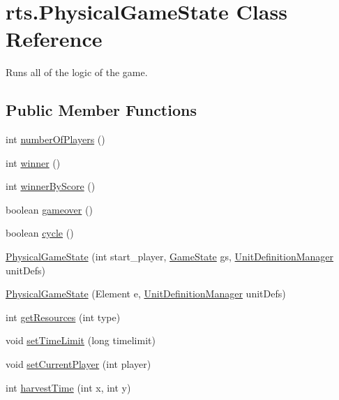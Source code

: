 \hypertarget{classrts_1_1_physical_game_state}{
\section{rts.PhysicalGameState Class Reference}
\label{classrts_1_1_physical_game_state}
}


Runs all of the logic of the game.  


\subsection*{Public Member Functions}
\begin{DoxyCompactItemize}
\item 
int \hyperlink{classrts_1_1_physical_game_state_a463cfb14c53ed9b8cdf0bd9a30245ec9}{numberOfPlayers} ()
\item 
int \hyperlink{classrts_1_1_physical_game_state_a4f47cea7ed91e75de4b9f9f160432f73}{winner} ()
\item 
int \hyperlink{classrts_1_1_physical_game_state_a204bd83cc193bcd2f0fa64b83547acd5}{winnerByScore} ()
\item 
boolean \hyperlink{classrts_1_1_physical_game_state_a1c524d46ccbf32aeddb8ba5cbe9f47c6}{gameover} ()
\item 
boolean \hyperlink{classrts_1_1_physical_game_state_a74a986ee337aa743097249693fdfd449}{cycle} ()
\item 
\hyperlink{classrts_1_1_physical_game_state_adff3634b5f1680a8df120f48ce96f78c}{PhysicalGameState} (int start\_\-player, \hyperlink{classrts_1_1_game_state}{GameState} gs, \hyperlink{classrts_1_1units_1_1_unit_definition_manager}{UnitDefinitionManager} unitDefs)
\item 
\hyperlink{classrts_1_1_physical_game_state_a8253ff150b31e81ef4228b7d59cd6eec}{PhysicalGameState} (Element e, \hyperlink{classrts_1_1units_1_1_unit_definition_manager}{UnitDefinitionManager} unitDefs)
\item 
int \hyperlink{classrts_1_1_physical_game_state_a66d5728a1d6ca0a6907f157000bb9fc5}{getResources} (int type)
\item 
void \hyperlink{classrts_1_1_physical_game_state_a681301d2c047c8aa4b8151416910bb7a}{setTimeLimit} (long timelimit)
\item 
void \hyperlink{classrts_1_1_physical_game_state_a752fffbb8516578e79e9df80b18cc7fa}{setCurrentPlayer} (int player)
\item 
int \hyperlink{classrts_1_1_physical_game_state_a8a14fcf77fe4d800d69f39e5f5e69650}{harvestTime} (int x, int y)

\end{DoxyCompactItemize}
